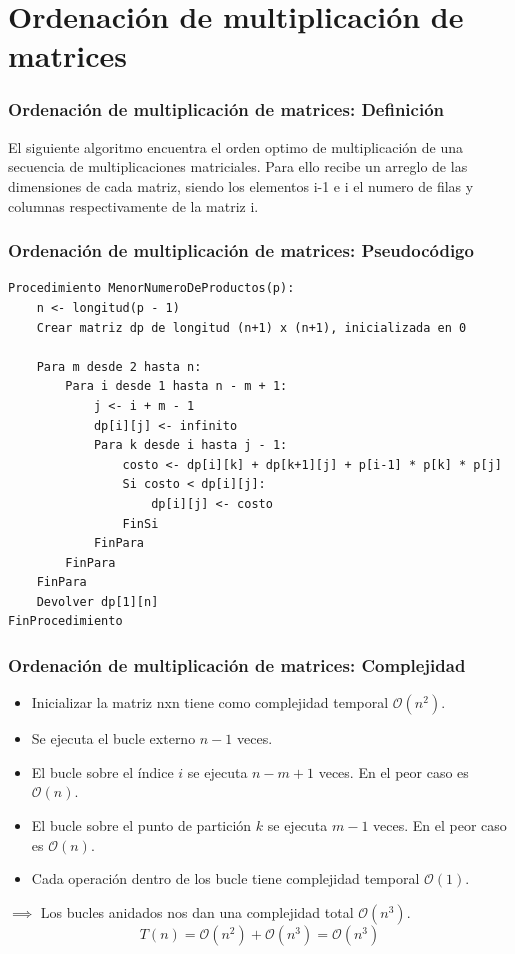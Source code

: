 \documentclass[10pt]{beamer}
\begin{document}
    \section{Ordenación de multiplicación de matrices}
    \begin{frame}
        \frametitle{Ordenación de multiplicación de matrices: Definición}
        El siguiente algoritmo encuentra el orden optimo de multiplicación de una 
        secuencia de multiplicaciones matriciales. Para ello recibe un arreglo de las 
        dimensiones de cada matriz, siendo los elementos i-1 e i el numero de filas y 
        columnas respectivamente de la matriz i.
    \end{frame}
    \begin{frame}[fragile]
        \frametitle{Ordenación de multiplicación de matrices: Pseudocódigo}
        \begin{lstlisting}[basicstyle=\ttfamily\scriptsize,tabsize=4]
Procedimiento MenorNumeroDeProductos(p):
    n <- longitud(p - 1)
    Crear matriz dp de longitud (n+1) x (n+1), inicializada en 0

    Para m desde 2 hasta n:
        Para i desde 1 hasta n - m + 1:
            j <- i + m - 1
            dp[i][j] <- infinito
            Para k desde i hasta j - 1:
                costo <- dp[i][k] + dp[k+1][j] + p[i-1] * p[k] * p[j]
                Si costo < dp[i][j]:
                    dp[i][j] <- costo
		        FinSi
	        FinPara
	    FinPara
    FinPara
    Devolver dp[1][n]
FinProcedimiento
        \end{lstlisting}
    \end{frame}
    \begin{frame}
        \frametitle{Ordenación de multiplicación de matrices: Complejidad}
        \begin{itemize}
            \item Inicializar la matriz nxn tiene como complejidad temporal $\mathcal{O}(n^2)$.
            \item Se ejecuta el bucle externo $n-1$ veces.
            \item El bucle sobre el índice $i$ se ejecuta $n-m+1$ veces. En el peor caso es $\mathcal{O}(n)$.
            \item El bucle sobre el punto de partición $k$ se ejecuta $m-1$ veces. En el peor caso es $\mathcal{O}(n)$.
            \item Cada operación dentro de los bucle tiene complejidad temporal $\mathcal{O}(1)$.
        \end{itemize}
        $\implies$ Los bucles anidados nos dan una complejidad total $\mathcal{O}(n^3)$.
        \begin{equation*}
            T(n) = \mathcal{O}(n^2) + \mathcal{O}(n^3) = \mathcal{O}(n^3)
        \end{equation*}
    \end{frame}
\end{document}
